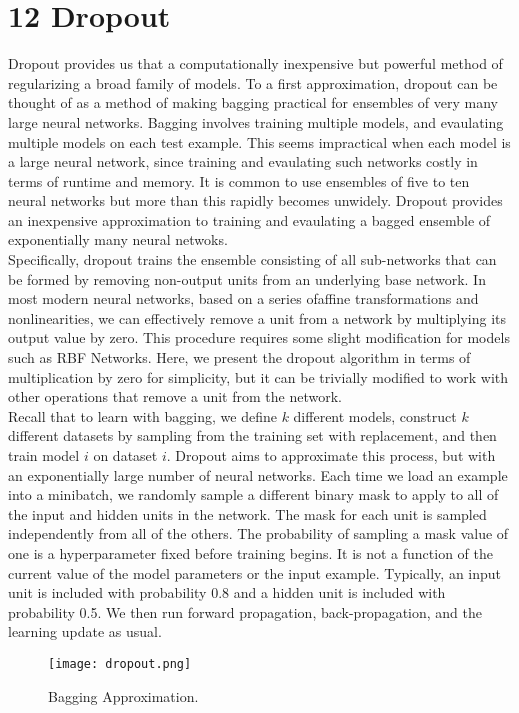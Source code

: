 \documentclass[11pt]{article}
\begin{document}
\section{12 Dropout}
\hspace*{1cm} Dropout provides us that a computationally inexpensive but powerful method of regularizing a broad family of models. To a first approximation, dropout can be thought of as a method of making bagging practical for ensembles of very many large neural networks. Bagging involves training multiple models, and evaulating multiple models on each test example. This seems impractical when each model is a large neural network, since training and evaulating such networks costly in terms of runtime and memory. It is common to use ensembles of five to ten neural networks but more than this rapidly becomes unwidely. Dropout provides an inexpensive approximation to training and evaulating a bagged ensemble of exponentially many neural netwoks.\\
Specifically, dropout trains the ensemble consisting of all sub-networks that
can be formed by removing non-output units from an underlying base network. In most modern neural networks, based on a series ofaffine transformations and nonlinearities, we can effectively remove a unit from a network by multiplying its output value by zero. This procedure requires some slight modification for models such as RBF Networks. Here, we present
the dropout algorithm in terms of multiplication by zero for simplicity, but it can be trivially modified to work with other operations that remove a unit from the network. \\
Recall that to learn with bagging, we define $k$ different models, construct $k$ different datasets by sampling from the training set with replacement, and then train model $i$ on dataset $i$. Dropout aims to approximate this process, but with an exponentially large number of neural networks. Each time we load an example into a minibatch, we randomly sample a different binary mask to apply to all of the input and hidden units in the network. The mask for each unit is sampled independently from all of the others. The probability of sampling a mask value of one is a hyperparameter fixed before training begins. It is not a function of the current value of the model parameters or the input example. Typically, an input unit is included with probability 0.8 and a hidden unit is included with probability 0.5. We then run forward propagation, back-propagation, and the
learning update as usual.
\begin{figure}[H]
\centering
\texttt{[image: dropout.png]}
\caption{Bagging Approximation.}
\label{fig:figure3}
\end{figure}\pagebreak
\end{document}
